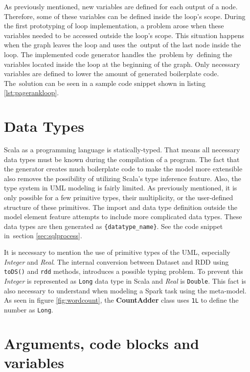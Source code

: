 As previously mentioned, new variables are defined for each output of a node. Therefore, some of these variables can be defined inside the loop's scope. During the first prototyping of loop implementation, a problem arose when these variables needed to be accessed outside the loop's scope. This situation happens when the graph leaves the loop and uses the~output of the last node inside the loop. The implemented code generator handles the~problem by~defining the variables located inside the loop at the beginning of the graph. Only necessary variables are defined to lower the amount of generated boilerplate code. The~solution can be seen in a sample code snippet shown in listing \ref{lst:pagerankloop}. 

\section{Data Types}

Scala as a programming language is statically-typed. That means all necessary data types must be known during the compilation of a program. The fact that the generator creates much boilerplate code to make the model more extensible also removes the possibility of utilizing Scala's type inference feature. Also, the type system in UML modeling is fairly limited. As previously mentioned, it is only possible for a few primitive types, their multiplicity, or the user-defined structure of these primitives. The import and data type definition outside the model element feature attempts to include more complicated data types. These data types are then generated as \texttt{\{datatype\_name\}}. See the code snippet in~section \ref{sec:sqlprocess}.

It is necessary to mention the use of primitive types of the UML, especially \textit{Integer} and \textit{Real}. The internal conversion between Dataset and RDD using \texttt{toDS()} and \texttt{rdd} methods, introduces a possible typing problem. To prevent this \textit{Integer} is represented as \texttt{Long} data type in Scala and \textit{Real} is \texttt{Double}. This fact is also necessary to understand when modeling a Spark task using the meta-model. As seen in figure \ref{fig:wordcount}, the \textbf{CountAdder} class uses \texttt{1L} to define the number as \texttt{Long}. 


\section{Arguments, code blocks and variables}


